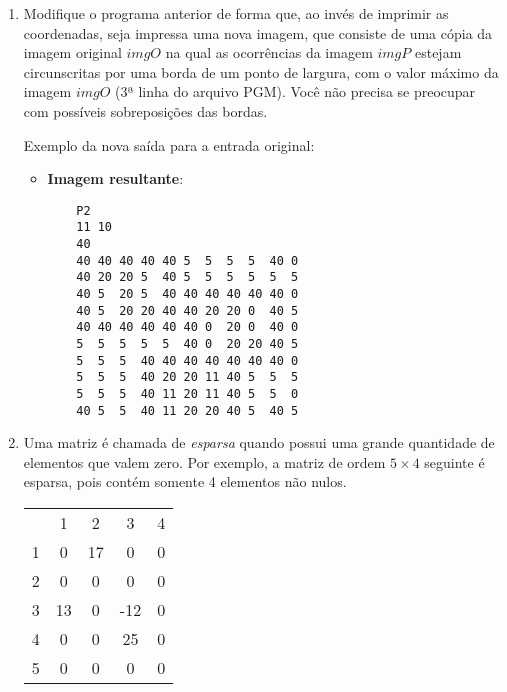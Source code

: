 \begin{enumerate}
\begin{itemize}
\vspace*{-4mm}      
    \item \textbf{Imagem do padrão}:
    \begin{verbatim}
    P2
    3 3
    20
    20 20 -1
    -1 20 -1
    -1 20 20
    \end{verbatim}
    
\vspace*{-4mm}      
    \item \textbf{Resultado do Programa}:
    \begin{verbatim}
    2 2
    7 4
    5 8   
    \end{verbatim}    
\end{itemize}

\item Modifique o programa anterior de forma que, ao invés de imprimir as 
coordenadas, seja impressa uma nova imagem, que consiste de uma cópia da 
imagem original $imgO$ na qual as ocorrências da imagem $imgP$ estejam 
circunscritas por uma borda de um ponto de largura, com o valor máximo da 
imagem $imgO$ (3ª linha do arquivo PGM). Você não precisa se preocupar com 
possíveis sobreposições das bordas.

Exemplo da nova saída para a entrada original:
\begin{itemize}
\vspace*{-2mm}      
    \item \textbf{Imagem resultante}:
    \begin{verbatim}
    P2
    11 10
    40
    40 40 40 40 40 5  5  5  5  40 0
    40 20 20 5  40 5  5  5  5  5  5
    40 5  20 5  40 40 40 40 40 40 0
    40 5  20 20 40 40 20 20 0  40 5
    40 40 40 40 40 40 0  20 0  40 0
    5  5  5  5  5  40 0  20 20 40 5
    5  5  5  40 40 40 40 40 40 40 0
    5  5  5  40 20 20 11 40 5  5  5
    5  5  5  40 11 20 11 40 5  5  0
    40 5  5  40 11 20 20 40 5  40 5
    \end{verbatim}
\end{itemize}

\item Uma matriz é chamada de \textit{esparsa} quando 
possui uma grande quantidade de elementos que valem zero. Por exemplo,
a matriz de ordem $5 \times 4$ seguinte é esparsa, pois contém somente
4 elementos não nulos.

\begin{center}
\begin{tabular}{c|c|c|c|c|} 
\multicolumn{1}{c}{} & \multicolumn{1}{c}{1} & \multicolumn{1}{c}{2} & \multicolumn{1}{c}{
3} & \multicolumn{1}{c}{4} \\ \cline{2-5}
1 & 0  & 17 & 0   & 0 \\ \cline{2-5}
2 & 0  & 0  & 0   & 0 \\ \cline{2-5}
3 & 13 & 0  & -12 & 0 \\ \cline{2-5}
4 & 0  & 0  & 25  & 0 \\ \cline{2-5}
5 & 0  & 0  & 0   & 0 \\ \cline{2-5}
\end{tabular}
\end{center}


\end{enumerate}
